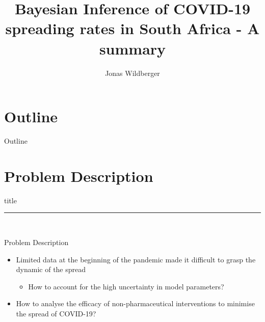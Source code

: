 \documentclass{beamer}
\title{ Bayesian Inference of COVID-19 spreading rates in South Africa - A summary}
\author{Jonas Wildberger}
\institute{University of Oxford}
\date{} %
\begin{document}
{ 
\frame{\titlepage}}

\section*{Outline}\begin{frame}{Outline}\tableofcontents\end{frame}

\section{Problem Description}
    \begin{frame}[plain]
        \vfill
      \centering
      \begin{beamercolorbox}[sep=8pt,center,shadow=true,rounded=true]{title}
        \insertsectionhead\par%
        \color{oxfordblue}\noindent\rule{10cm}{1pt} \\
       
      \end{beamercolorbox}
      \vfill
  \end{frame}


\begin{frame}{Problem Description}
\begin{itemize}
	\item<1-> Limited data at the beginning of the pandemic made it difficult to grasp the dynamic of the spread
	\begin{itemize}
		\item<1-> How to account for the high uncertainty in model parameters?
	\end{itemize}
	\item<2-> How to analyse the efficacy of non-pharmaceutical interventions to minimise the spread of COVID-19?	
\end{itemize}
	
	\begin{center}
	\end{center}
	 


\end{frame}
\end{document}
